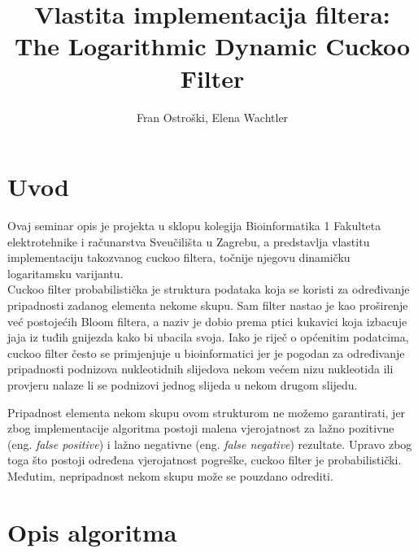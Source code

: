 \documentclass[times, utf8, seminar, numeric]{fer}
\begin{document}
\nocite{*}

\title{Vlastita implementacija filtera: \protect\\ The Logarithmic Dynamic Cuckoo Filter}

\author{Fran Ostroški, Elena Wachtler}


\maketitle

\tableofcontents

\chapter{Uvod}

Ovaj seminar opis je projekta u sklopu kolegija Bioinformatika 1 Fakulteta elektrotehnike i računarstva Sveučilišta u Zagrebu, a predstavlja vlastitu implementaciju takozvanog cuckoo filtera, točnije njegovu dinamičku logaritamsku varijantu. \\

Cuckoo filter probabilistička je struktura podataka koja se koristi za određivanje pripadnosti zadanog elementa nekome skupu. Sam filter nastao je kao proširenje već postojećih Bloom filtera, a naziv je dobio prema ptici kukavici koja izbacuje jaja iz tuđih gnijezda kako bi ubacila svoja. Iako je riječ o općenitim podatcima, cuckoo filter često se primjenjuje u bioinformatici jer je pogodan za određivanje pripadnosti podnizova nukleotidnih slijedova nekom većem nizu nukleotida ili provjeru nalaze li se podnizovi jednog slijeda u nekom drugom slijedu.

Pripadnost elementa nekom skupu ovom strukturom ne možemo garantirati, jer zbog implementacije algoritma postoji malena vjerojatnost za lažno pozitivne (eng. \textit{false positive}) i lažno negativne (eng. \textit{false negative}) rezultate. Upravo zbog toga što postoji određena vjerojatnost pogreške, cuckoo filter je probabilistički. Međutim, nepripadnost nekom skupu može se pouzdano odrediti. \\


\chapter{Opis algoritma}
\end{document}
